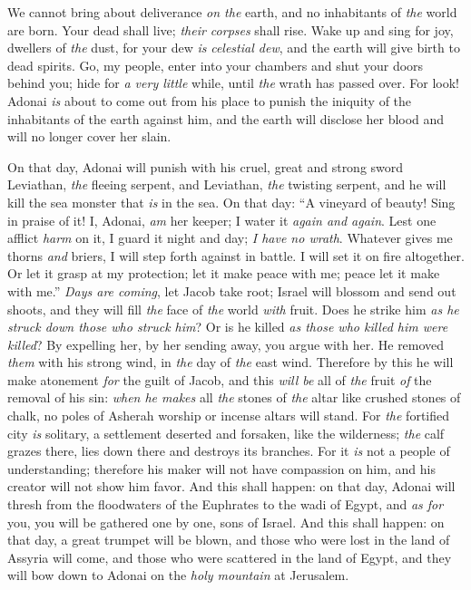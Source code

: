 \begin{biblechapter}
We cannot bring about deliverance \textit{on the} earth, 
and no inhabitants of \textit{the} world are born.
\verse Your dead shall live; \textit{their corpses} shall rise. 
Wake up and sing for joy, dwellers of \textit{the} dust, 
for your dew \textit{is} \textit{celestial dew}, 
and the earth will give birth to dead spirits.
\verse Go, my people, enter into your chambers 
and shut your doors behind you; 
hide for \textit{a very little} while, 
until \textit{the} wrath has passed over.
\verse For look! Adonai \textit{is} about to come out from his place 
to punish the iniquity of the inhabitants of the earth against him, 
and the earth will disclose her blood 
and will no longer cover her slain.
\end{biblechapter}

\begin{biblechapter} %
 On that day, Adonai will punish with his cruel, great and strong sword Leviathan, \textit{the} fleeing serpent, and Leviathan, \textit{the} twisting serpent, and he will kill the sea monster that \textit{is} in the sea.
\verse On that day:
\verse “A vineyard of beauty! Sing in praise of it!
\verse I, Adonai, \textit{am} her keeper; 
I water it \textit{again and again}. 
Lest one afflict \textit{harm} on it, 
I guard it night and day;
\verse \textit{I have no wrath}. 
Whatever gives me thorns \textit{and} briers, 
I will step forth against in battle. 
I will set it on fire altogether.
\verse Or let it grasp at my protection; 
let it make peace with me; 
peace let it make with me.”
\verse \textit{Days are coming}, let Jacob take root; 
Israel will blossom and send out shoots, 
and they will fill \textit{the} face of \textit{the} world \textit{with} fruit.
\verse Does he strike him \textit{as he struck down those who struck him}? 
Or is he killed \textit{as those who killed him were killed}?
\verse By expelling her, by her sending away, you argue with her. 
He removed \textit{them} with his strong wind, 
in \textit{the} day of \textit{the} east wind.
\verse Therefore by this he will make atonement \textit{for} the guilt of Jacob, 
and this \textit{will be} all of \textit{the} fruit \textit{of} the removal of his sin: 
\textit{when he makes} all \textit{the} stones of \textit{the} altar like crushed stones of chalk, 
no poles of Asherah worship or incense altars will stand.
\verse For \textit{the} fortified city \textit{is} solitary, 
a settlement deserted and forsaken, like the wilderness; 
\textit{the} calf grazes there, 
lies down there and destroys its branches. For it \textit{is} not a people of understanding; therefore his maker will not have compassion on him, 
and his creator will not show him favor.
\verse And this shall happen: on that day, Adonai will thresh from the floodwaters of the Euphrates to the wadi of Egypt, and \textit{as for} you, you will be gathered one by one, sons of Israel.
\verse And this shall happen: on that day, a great trumpet will be blown, and those who were lost in the land of Assyria will come, 
and those who were scattered in the land of Egypt, and they will bow down to Adonai on the \textit{holy mountain} at Jerusalem.
\end{biblechapter}

